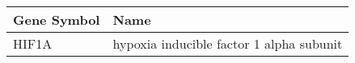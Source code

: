 \begin{tabular}{ll}
\toprule
Gene Symbol &                                     Name \\
\midrule
      HIF1A & hypoxia inducible factor 1 alpha subunit \\
\bottomrule
\end{tabular}
